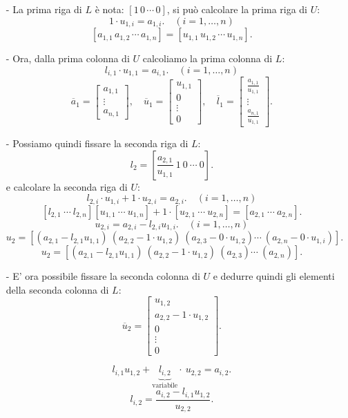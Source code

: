 \begin{itemize}
\item[-]La prima riga di $L$ è nota: $\left[1\, 0\, \cdots\, 0\right]$, si può
calcolare la prima riga di $U$:
\[1 \cdot u_{1,i} = a_{1,i}. \quad (i = 1, \ldots, n) \]
\[\left[a_{1,1} \, a_{1,2} \, \cdots \, a_{1,n}\right]
=
\left[u_{1,1} \, u_{1,2} \, \cdots \, u_{1,n}\right].\]
\item[-]Ora, dalla prima colonna di $U$ calcoliamo la prima colonna di $L$:
\[l_{i,1} \cdot u_{1,1} = a_{i,1}. \quad (i = 1, \ldots, n)\]
\[
\overline{a}_1 = \left[
\begin{array}{c}
a_{1,1} \\
\vdots \\
a_{n,1}
\end{array}\right], \quad
\overline{u}_1 = \left[
\begin{array}{c}
u_{1,1} \\
0 \\
\vdots \\
0
\end{array}\right], \quad
\overline{l}_1 = \left[
\begin{array}{c}
\frac{a_{1,1}}{u_{1,1}} \\
\vdots \\
\frac{a_{n,1}}{u_{1,1}}
\end{array}\right].
\]

\item[-]Possiamo quindi fissare la seconda riga di $L$:
\[l_2 = \left[\frac{a_{2,1}}{u_{1,1}}\ 1 \ 0\ \cdots \ 0 \right].\]
e calcolare la seconda riga di $U$:
\[l_{2,i}\cdot u_{1,i} + 1 \cdot u_{2,i} = a_{2,i}. \quad (i = 1, \ldots, n) \]
\[\left[
l_{2,1} \ \cdots \ l_{2,n}
\right]
\left[
u_{1,1} \ \cdots \ u_{1,n}
\right] + 1\cdot \left[
u_{2,1} \ \cdots \ u_{2,n}
\right] = \left[
a_{2,1} \ \cdots \ a_{2,n}
\right].\]
\[u_{2,i} = a_{2,i} - l_{2,i}u_{1,i}. \quad (i = 1, \ldots, n)\]
\[u_2 =
\left[(a_{2,1}- l_{2,1}u_{1,1}) \ (a_{2,2} - 1\cdot u_{1,2}) \
(a_{2,3} - 0\cdot u_{1,2})\cdots \ (a_{2,n} -
0 \cdot u_{1,i})\right].
\]
\[u_2 =
\left[(a_{2,1}- l_{2,1}u_{1,1}) \ (a_{2,2} - 1\cdot u_{1,2}) \
(a_{2,3})\cdots \ (a_{2,n})\right].
\]
\item[-]E' ora possibile fissare la seconda colonna di $U$ e dedurre quindi
gli elementi della seconda colonna di $L$:
\[\overline{u}_2 =\left[
\begin{array}{c}
u_{1,2} \\
a_{2,2} - 1\cdot u_{1,2} \\
0 \\
\vdots \\
0
\end{array}\right].
\]

\[l_{i,1}u_{1,2} + \underbrace{l_{i,2}}_{\textrm{variabile}}\cdot\ u_{2,2} = a_{i,2}.\]
\[l_{i,2} = \frac{a_{i,2}- l_{i,1}u_{1,2}}{u_{2,2}}.\]
\end{itemize}

